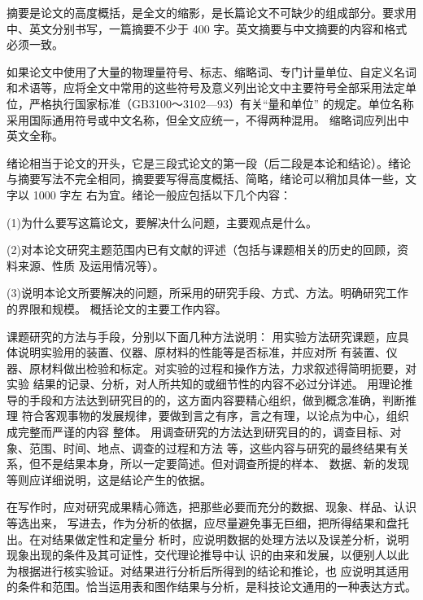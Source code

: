 


摘要是论文的高度概括，是全文的缩影，是长篇论文不可缺少的组成部分。要求用中、英文分别书写，一篇摘要不少于 400 字。英文摘要与中文摘要的内容和格式必须一致。


如果论文中使用了大量的物理量符号、标志、缩略词、专门计量单位、自定义名词和术语等，应将全文中常用的这些符号及意义列出论文中主要符号全部采用法定单位，严格执行国家标准（GB3100～3102—93）有关“量和单位”
的规定。单位名称采用国际通用符号或中文名称，但全文应统一，不得两种混用。 缩略词应列出中英文全称。



绪论相当于论文的开头，它是三段式论文的第一段（后二段是本论和结论）。绪论
与摘要写法不完全相同，摘要要写得高度概括、简略，绪论可以稍加具体一些，文字以 1000 字左 右为宜。绪论一般应包括以下几个内容： 

(1)为什么要写这篇论文，要解决什么问题，主要观点是什么。

(2)对本论文研究主题范围内已有文献的评述（包括与课题相关的历史的回顾，资料来源、性质
及运用情况等）。

(3)说明本论文所要解决的问题，所采用的研究手段、方式、方法。明确研究工作的界限和规模。
概括论文的主要工作内容。

课题研究的方法与手段，分别以下面几种方法说明： 用实验方法研究课题，应具体说明实验用的装置、仪器、原材料的性能等是否标准，并应对所
有装置、仪器、原材料做出检验和标定。对实验的过程和操作方法，力求叙述得简明扼要，对实验 结果的记录、分析，对人所共知的或细节性的内容不必过分详述。 用理论推导的手段和方法达到研究目的的，这方面内容要精心组织，做到概念准确，判断推理
符合客观事物的发展规律，要做到言之有序，言之有理，以论点为中心，组织成完整而严谨的内容 整体。
用调查研究的方法达到研究目的的，调查目标、对象、范围、时间、地点、调查的过程和方法
等，这些内容与研究的最终结果有关系，但不是结果本身，所以一定要简述。但对调查所提的样本、 数据、新的发现等则应详细说明，这是结论产生的依据。


在写作时，应对研究成果精心筛选，把那些必要而充分的数据、现象、样品、认识等选出来，
写进去，作为分析的依据，应尽量避免事无巨细，把所得结果和盘托出。在对结果做定性和定量分 析时，应说明数据的处理方法以及误差分析，说明现象出现的条件及其可证性，交代理论推导中认 识的由来和发展，以便别人以此为根据进行核实验证。对结果进行分析后所得到的结论和推论，也 应说明其适用的条件和范围。恰当运用表和图作结果与分析，是科技论文通用的一种表达方式。

